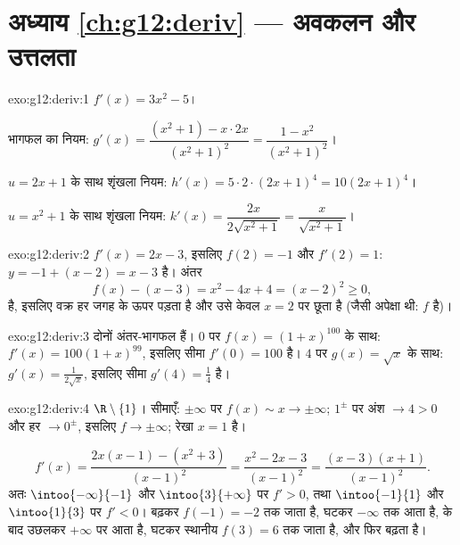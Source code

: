 \section*{अध्याय \ref{ch:g12:deriv} --- अवकलन और उत्तलता}

\begin{solution}{exo:g12:deriv:1}
$f'(x) = 3x^2 - 5$।

भागफल का नियम: $g'(x) = \dfrac{(x^2+1) - x\cdot 2x}{(x^2+1)^2} = \dfrac{1 - x^2}{(x^2+1)^2}$।

$u = 2x+1$ के साथ शृंखला नियम: $h'(x) = 5 \cdot 2 \cdot (2x+1)^4 = 10(2x+1)^4$।

$u = x^2 + 1$ के साथ शृंखला नियम: $k'(x) = \dfrac{2x}{2\sqrt{x^2+1}} = \dfrac{x}{\sqrt{x^2+1}}$।
\end{solution}

\begin{solution}{exo:g12:deriv:2}
$f'(x) = 2x - 3$, इसलिए $f(2) = -1$ और $f'(2) = 1$:  $y = -1 + (x - 2) = x - 3$ है। अंतर
\[
f(x) - (x - 3) = x^2 - 4x + 4 = (x-2)^2 \geq 0 ,
\]
है, इसलिए वक्र हर जगह  के ऊपर पड़ता है और उसे केवल $x = 2$ पर छूता है
(जैसी अपेक्षा थी: $f$  है)।
\end{solution}

\begin{solution}{exo:g12:deriv:3}
दोनों अंतर-भागफल हैं। $0$ पर $f(x) = (1+x)^{100}$ के साथ: $f'(x) = 100(1+x)^{99}$, इसलिए सीमा $f'(0) = 100$ है। $4$ पर
$g(x) = \sqrt{x}$ के साथ: $g'(x) = \frac{1}{2\sqrt{x}}$, इसलिए सीमा $g'(4) = \frac14$ है।
\end{solution}

\begin{solution}{exo:g12:deriv:4}
 $\R \setminus \{1\}$। सीमाएँ: $\pm\infty$ पर $f(x) \sim x \to
\pm\infty$; $1^\pm$ पर अंश $\to 4 > 0$ और हर $\to 0^\pm$, इसलिए $f \to \pm\infty$;
रेखा $x = 1$  है।

\[
f'(x) = \frac{2x(x-1) - (x^2+3)}{(x-1)^2} = \frac{x^2 - 2x - 3}{(x-1)^2}
= \frac{(x-3)(x+1)}{(x-1)^2}.
\]
अतः $\intoo{-\infty}{-1}$ और $\intoo{3}{+\infty}$ पर $f' > 0$, तथा $\intoo{-1}{1}$ और $\intoo{1}{3}$ पर $f' < 0$।  बढ़कर 
$f(-1) = -2$ तक जाता है, घटकर $-\infty$ तक आता है,  के बाद उछलकर $+\infty$ पर आता
है, घटकर स्थानीय  $f(3) = 6$ तक जाता है, और फिर बढ़ता है।
\end{solution}

